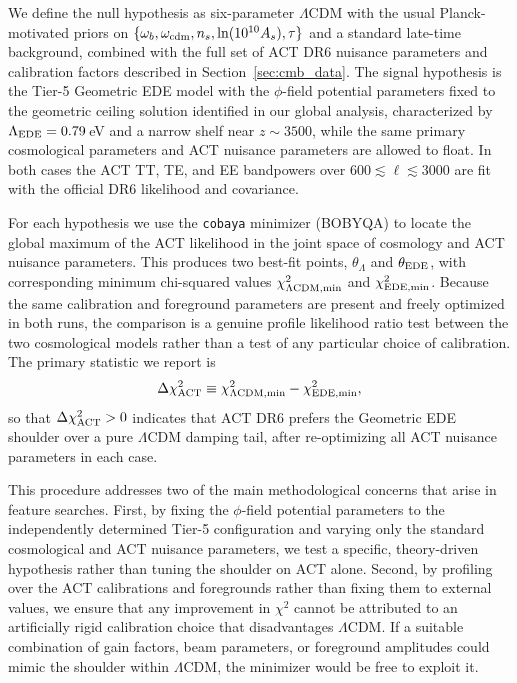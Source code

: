 \documentclass[a4paper,11pt]{article}
\begin{document}
We define the null hypothesis as six-parameter $\Lambda$CDM with the usual Planck-motivated priors on $\{\omega_b,\omega_{\rm cdm},n_s,\ln(10^{10}A_s),\tau\}$ and a standard late-time background, combined with the full set of ACT DR6 nuisance parameters and calibration factors described in Section~\ref{sec:cmb_data}. The signal hypothesis is the Tier-5 Geometric EDE model with the $\phi$-field potential parameters fixed to the geometric ceiling solution identified in our global analysis, characterized by $\Lambda_{\rm EDE}=0.79$\,eV and a narrow shelf near $z \sim 3500$, while the same primary cosmological parameters and ACT nuisance parameters are allowed to float. In both cases the ACT TT, TE, and EE bandpowers over $600 \lesssim \ell \lesssim 3000$ are fit with the official DR6 likelihood and covariance.

For each hypothesis we use the \texttt{cobaya} minimizer (BOBYQA) to locate the global maximum of the ACT likelihood in the joint space of cosmology and ACT nuisance parameters. This produces two best-fit points, $\theta_{\Lambda}$ and $\theta_{\rm EDE}$, with corresponding minimum chi-squared values $\chi^2_{\Lambda{\rm CDM,min}}$ and $\chi^2_{{\rm EDE,min}}$. Because the same calibration and foreground parameters are present and freely optimized in both runs, the comparison is a genuine profile likelihood ratio test between the two cosmological models rather than a test of any particular choice of calibration. The primary statistic we report is
\begin{equation}
\Delta \chi^2_{\rm ACT}
\equiv
\chi^2_{\Lambda{\rm CDM,min}} - \chi^2_{{\rm EDE,min}},
\end{equation}
so that $\Delta \chi^2_{\rm ACT} > 0$ indicates that ACT DR6 prefers the Geometric EDE shoulder over a pure $\Lambda$CDM damping tail, after re-optimizing all ACT nuisance parameters in each case.

This procedure addresses two of the main methodological concerns that arise in feature searches. First, by fixing the $\phi$-field potential parameters to the independently determined Tier-5 configuration and varying only the standard cosmological and ACT nuisance parameters, we test a specific, theory-driven hypothesis rather than tuning the shoulder on ACT alone. Second, by profiling over the ACT calibrations and foregrounds rather than fixing them to external values, we ensure that any improvement in $\chi^2$ cannot be attributed to an artificially rigid calibration choice that disadvantages $\Lambda$CDM. If a suitable combination of gain factors, beam parameters, or foreground amplitudes could mimic the shoulder within $\Lambda$CDM, the minimizer would be free to exploit it.
\end{document}
